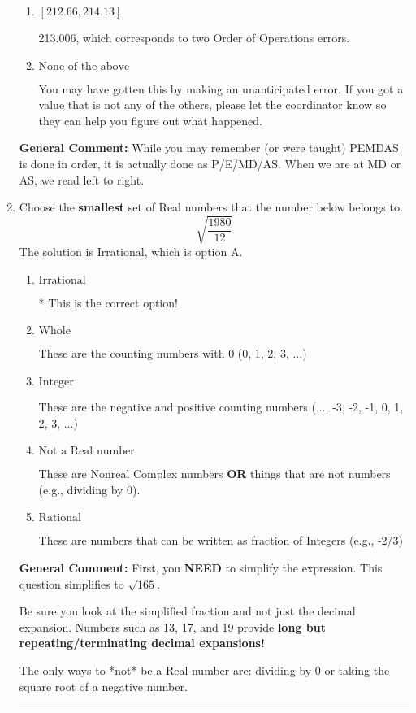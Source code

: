 \documentclass{extbook}[14pt]
\newcommand{\litem}[1]{\item #1

\rule{\textwidth}{0.4pt}}
\begin{document}
\begin{enumerate}
{\begin{enumerate}[label=\Alph*.]
 214.442, which corresponds to an Order of Operations error: multiplying by negative before squaring. For example: $(-3)^2 \neq -3^2$
\item \( [212.66, 214.13] \)

 213.006, which corresponds to two Order of Operations errors.
\item \( \text{None of the above} \)

 You may have gotten this by making an unanticipated error. If you got a value that is not any of the others, please let the coordinator know so they can help you figure out what happened.
\end{enumerate}

\textbf{General Comment:} While you may remember (or were taught) PEMDAS is done in order, it is actually done as P/E/MD/AS. When we are at MD or AS, we read left to right.
}
\litem{
Choose the \textbf{smallest} set of Real numbers that the number below belongs to.
\[ \sqrt{\frac{1980}{12}} \]The solution is \( \text{Irrational} \), which is option A.\begin{enumerate}[label=\Alph*.]
\item \( \text{Irrational} \)

* This is the correct option!
\item \( \text{Whole} \)

These are the counting numbers with 0 (0, 1, 2, 3, ...)
\item \( \text{Integer} \)

These are the negative and positive counting numbers (..., -3, -2, -1, 0, 1, 2, 3, ...)
\item \( \text{Not a Real number} \)

These are Nonreal Complex numbers \textbf{OR} things that are not numbers (e.g., dividing by 0).
\item \( \text{Rational} \)

These are numbers that can be written as fraction of Integers (e.g., -2/3)
\end{enumerate}

\textbf{General Comment:} First, you \textbf{NEED} to simplify the expression. This question simplifies to $\sqrt{165}$. 
 
 Be sure you look at the simplified fraction and not just the decimal expansion. Numbers such as 13, 17, and 19 provide \textbf{long but repeating/terminating decimal expansions!} 
 
 The only ways to *not* be a Real number are: dividing by 0 or taking the square root of a negative number. 
 
}
\end{enumerate}
\end{document}
